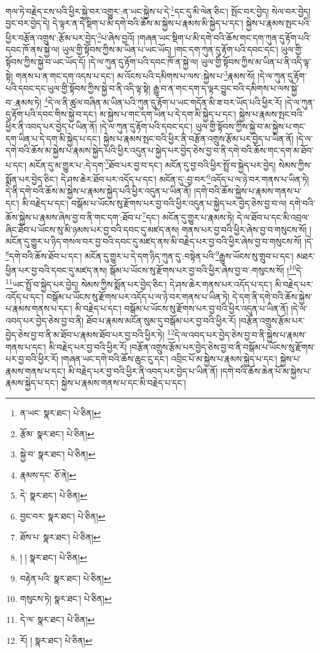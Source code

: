 གལ་ཏེ་བརྗེད་ངས་པའི་ཕྱིར་སྐྱེ་བར་འགྱུར་:ན་ཡང་སྐྱེས་པ་དེ་\footnote{ན་ཡང་  སྣར་ཐང་།  པེ་ཅིན། }དང་དུ་མི་ལེན་ཅིང་། སྤོང་བར་བྱེད། སེལ་བར་བྱེད། བྱང་བར་བྱེད་དེ། དེ་ལྟར་ན་དེ་སྡིག་པ་མི་དགེ་བའི་ཆོས་མ་སྐྱེས་པ་རྣམས་མི་སྐྱེད་པ་དང་། སྐྱེས་པ་རྣམས་སྤང་པའི་ཕྱིར་བརྩོན་འགྲུས་:རྩོམ་པར་བྱེད་\footnote{རྩོམ་  སྣར་ཐང་།  པེ་ཅིན། }པ་ཞེས་བྱའོ། །གཞན་ཡང་སྡིག་པ་མི་དགེ་བའི་ཆོས་གང་དག་ཀུན་དུ་རྟོག་པའི་དབང་ཁོ་ནས་སྐྱེ་ལ། ཡུལ་གྱི་སྟོབས་ཀྱིས་མ་ཡིན་པ་ཡང་ཡོད། །གང་དག་ཀུན་དུ་རྟོག་པའི་དབང་དང་། ཡུལ་གྱི་སྟོབས་ཀྱིས་སྐྱེ་བ་ཡང་ཡོད་དོ། །དེ་ལ་ཀུན་དུ་རྟོག་པའི་དབང་ཁོ་ན་སྐྱེ་ལ། ཡུལ་གྱི་སྟོབས་ཀྱིས་མ་ཡིན་པ་ནི་འདི་ལྟ་སྟེ། གནས་པ་ན་གང་དག་འདས་པ་དང་། མ་འོངས་པའི་དམིགས་པ་ལས་:སྐྱེས་པ་\footnote{སྐྱེ་བ་  སྣར་ཐང་།  པེ་ཅིན། }རྣམས་སོ། །དེ་ལ་ཀུན་དུ་རྟོག་པའི་དབང་དང་ཡུལ་གྱི་སྟོབས་ཀྱིས་སྐྱེ་བ་ནི་འདི་ལྟ་སྟེ། རྒྱུ་བ་ན་གང་དག་ད་ལྟར་བྱུང་བའི་དམིགས་པ་ལས་སྐྱེ་བ་:རྣམས་ཏེ། \footnote{རྣམས་དང་  ཅོ་ནེ། }དེ་ལ་ནི་ཚུལ་བཞིན་མ་ཡིན་པའི་ཀུན་དུ་རྟོག་པ་ཡང་གདོན་མི་ཟ་བར་ཡོད་པའི་ཕྱིར་རོ། །དེ་ལ་ཀུན་དུ་རྟོག་པའི་དབང་གིས་སྐྱེ་བ་དང་། མ་སྐྱེས་པ་གང་དག་ཡིན་པ་དེ་དག་མི་སྐྱེད་པ་དང་། སྐྱེས་པ་རྣམས་སྤང་བའི་ཕྱིར་ནི་འབད་པར་བྱེད་པ་ཡིན་ནོ། །དེ་ལ་ཀུན་དུ་རྟོག་པའི་དབང་དང་། ཡུལ་གྱི་སྟོབས་ཀྱིས་སྐྱེ་བ་མ་སྐྱེས་པ་གང་དག་ཡིན་པ་དེ་དག་མི་སྐྱེད་པ་དང་། སྐྱེས་པ་རྣམས་སྤང་བའི་ཕྱིར་ནི་བརྩོན་འགྲུས་རྩོམ་པར་བྱེད་པ་ཡིན་ནོ། །དེ་ལ་དགེ་བའི་ཆོས་མ་སྐྱེས་པ་རྣམས་སྐྱེད་པའི་ཕྱིར་འདུན་པ་སྐྱེད་པར་བྱེད་ཅེས་བྱ་བ་ནི་དགེ་བའི་ཆོས་གང་དག་མ་ཐོབ་པ་དང་། མངོན་དུ་མ་གྱུར་པ་:དེ་དག་\footnote{དེ་  སྣར་ཐང་།  པེ་ཅིན། }ཐོབ་པར་བྱ་བ་དང་། མངོན་དུ་བྱ་བའི་ཕྱིར་སྤྲོ་བ་སྐྱེད་པར་བྱེད། སེམས་ཀྱིས་སྨོན་པར་བྱེད་ཅིང་། དེ་ཤས་ཆེར་ཐོབ་པར་འདོད་པ་དང་། མངོན་དུ་:བྱ་བར་\footnote{བྱང་བར་  སྣར་ཐང་།  པེ་ཅིན། }འདོད་པ་ལ་ཉེ་བར་གནས་པ་ཡིན་ཏེ། དེ་ནི་དགེ་བའི་ཆོས་མ་སྐྱེས་པ་རྣམས་སྐྱེད་པའི་ཕྱིར་འདུན་པ་ཡིན་ནོ། །དགེ་བའི་ཆོས་སྐྱེས་པ་རྣམས་གནས་པ་དང་། མི་བརྗེད་པ་དང་། བསྒོམ་པ་ཡོངས་སུ་རྫོགས་པར་བྱ་བའི་ཕྱིར་འདུན་པ་སྐྱེད་པར་བྱེད་ཅེས་བྱ་བ་ལ། དགེ་བའི་ཆོས་སྐྱེས་པ་རྣམས་ཞེས་བྱ་བ་ནི་གང་དག་:ཐོབ་པ་\footnote{ཐོས་པ་  སྣར་ཐང་།  པེ་ཅིན། }དང་། མངོན་དུ་གྱུར་པ་རྣམས་ཏེ། དེ་ལ་ཐོབ་པ་དང་མི་འབྲལ་ཞིང་ཐོབ་པ་ཡོངས་སུ་མི་ཉམས་པར་བྱ་བའི་དབང་དུ་མཛད་ནས། གནས་པར་བྱ་བའི་ཕྱིར་ཞེས་བྱ་བ་གསུངས་སོ། །མངོན་དུ་གྱུར་པ་ཉིད་གསལ་བར་བྱ་བའི་དབང་དུ་མཛད་ནས་མི་བརྗེད་པར་བྱ་བའི་ཕྱིར་ཞེས་བྱ་བ་གསུངས་སོ། །དེ་\footnote{། །  སྣར་ཐང་།  པེ་ཅིན། }དགེ་བའི་ཆོས་ཐོབ་པ་དང་། མངོན་དུ་གྱུར་པ་དེ་དག་ཉིད་ཀུན་དུ་:བསྟེན་པའི་\footnote{བརྟེན་པའི་  སྣར་ཐང་།  པེ་ཅིན། }རྒྱུས་ཡོངས་སུ་གྲུབ་པ་དང་། མཐར་ཕྱིན་པར་བྱ་བའི་དབང་དུ་མཛད་ནས། སྒོམ་པ་ཡོངས་སུ་རྫོགས་པར་བྱ་བའི་ཕྱིར་ཞེས་བྱ་བ་:གསུངས་སོ། །\footnote{གསུངས་ཏེ།   སྣར་ཐང་།  པེ་ཅིན། }དེ་\footnote{དེ་ལ་  སྣར་ཐང་།  པེ་ཅིན། }ཡང་སྤྲོ་བ་སྐྱེད་པར་བྱེད། སེམས་ཀྱིས་སྨོན་པར་བྱེད་ཅིང་། དེ་ཤས་ཆེར་གནས་པར་འདོད་པ་དང་། མི་བརྗེད་པར་འདོད་པ་དང་། བསྒོམ་པ་ཡོངས་སུ་རྫོགས་པར་འདོད་པ་ལ་ཉེ་བར་གནས་པ་ཡིན་ཏེ། དེ་དག་ནི་དགེ་བའི་ཆོས་སྐྱེས་པ་རྣམས་གནས་པ་དང་། མི་བརྗེད་པ་དང་། བསྒོམ་པ་ཡོངས་སུ་རྫོགས་པར་བྱ་བའི་ཕྱིར་འདུན་པ་ཡིན་ནོ། །དེ་ལ་འབད་པར་བྱེད་ཅེས་བྱ་བ་ནི། ཐོབ་པ་རྣམས་མངོན་སུམ་དུ་བསྒོམ་པར་བྱ་བའི་ཕྱིར་རོ། །བརྩོན་འགྲུས་རྩོམ་པར་བྱེད་ཅེས་བྱ་བ་ནི་མ་ཐོབ་པ་རྣམས་ཐོབ་པར་བྱ་བའི་ཕྱིར་ཏེ། \footnote{རོ། །   སྣར་ཐང་།  པེ་ཅིན། }དེ་ལ་འབད་པར་བྱེད་ཅེས་བྱ་བ་ནི་སྐྱེས་པ་རྣམས་གནས་པ་དང་། མི་བརྗེད་པར་བྱ་བའི་ཕྱིར་རོ། །བརྩོན་འགྲུས་རྩོམ་པར་བྱེད་ཅེས་བྱ་བ་ནི་བསྒོམ་པ་ཡོངས་སུ་རྫོགས་པར་བྱ་བའི་ཕྱིར་རོ། །གཞན་ཡང་དགེ་བའི་ཆོས་ཆུང་ངུ་དང་། འབྲིང་པོ་མ་སྐྱེས་པ་རྣམས་སྐྱེད་པ་དང་། སྐྱེས་པ་རྣམས་གནས་པ་དང་། མི་བརྗེད་པར་བྱ་བའི་ཕྱིར་ནི་འབད་པར་བྱེད་པ་ཡིན་ནོ། །དགེ་བའི་ཆོས་ཆེན་པོ་མ་སྐྱེས་པ་རྣམས་སྐྱེད་པ་དང་། སྐྱེས་པ་རྣམས་གནས་པ་དང་མི་བརྗེད་པ་དང་། 